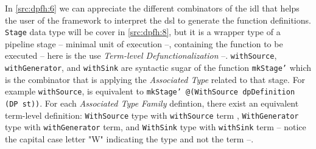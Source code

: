 In \autoref{src:dpfh:6} we can appreciate the different combinators of the \acrshort{idl} that helps the user of the framework to interpret the \acrshort{dsl} to generate the function definitions.
\texttt{Stage} data type will be cover in \autoref{src:dpfh:8}, but it is a wrapper type of a pipeline stage -- minimal unit of execution --, containing the function to be executed -- here is the use \emph{Term-level Defunctionalization} --.
\texttt{withSource}, \texttt{withGenerator}, and \texttt{withSink} are syntactic sugar of the function \texttt{mkStage'} which is the combinator that is applying the \emph{Associated Type} related to that stage. For example \texttt{withSource}, is equivalent to \texttt{mkStage' @(WithSource dpDefinition (DP st))}.
For each \emph{Associated Type Family} defintion, there exist an equivalent term-level definition: \texttt{WithSource} type with \texttt{withSource} term , \texttt{WithGenerator} type with \texttt{withGenerator} term, and \texttt{WithSink} type with \texttt{withSink} term -- notice the capital case letter "W" indicating the type and not the term --.

